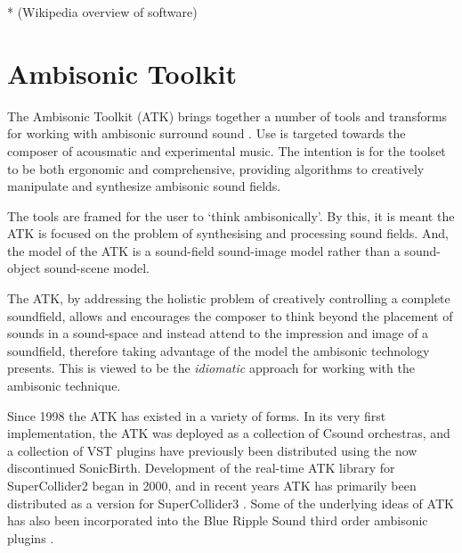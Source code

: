 \documentclass{article}
\begin{document}
* (Wikipedia overview of software)




\section{Ambisonic Toolkit}\label{sec:atk}

The Ambisonic Toolkit (ATK) brings together a number of tools and transforms for working with ambisonic surround sound  \cite{Anderson:2009introducingATK, anderson:ambisonic_2011}.
Use is targeted towards the composer of acousmatic and experimental music. The intention is for the toolset to be both ergonomic and comprehensive, providing algorithms to creatively manipulate and synthesize ambisonic sound fields.

The tools are framed for the user to `think ambisonically'. By this, it is meant the ATK is focused on the problem of synthesising and processing sound fields. And, the model of the ATK is a sound-field sound-image model rather than a sound-object sound-scene model. 




The ATK, by addressing the holistic problem of creatively controlling a complete soundfield, allows and encourages the composer to think beyond the placement of sounds in a sound-space and instead attend to the impression and image of a soundfield, therefore taking advantage of the model the ambisonic technology presents.
This is viewed to be the {\em idiomatic} approach for working with the ambisonic technique.



Since 1998 the ATK has existed in a variety of forms.
In its very first implementation, the ATK was deployed as a collection of Csound orchestras, and a collection of VST plugins have previously been distributed using the now discontinued SonicBirth.
Development of the real-time ATK library for SuperCollider2 began in 2000, and in recent years ATK has primarily been distributed as a version for SuperCollider3 \cite{Anderson:2009introducingATK}.
Some of the underlying ideas of ATK has also been incorporated into the Blue Ripple Sound third order ambisonic plugins \cite{blueripple:2014TOA}.
\end{document}
